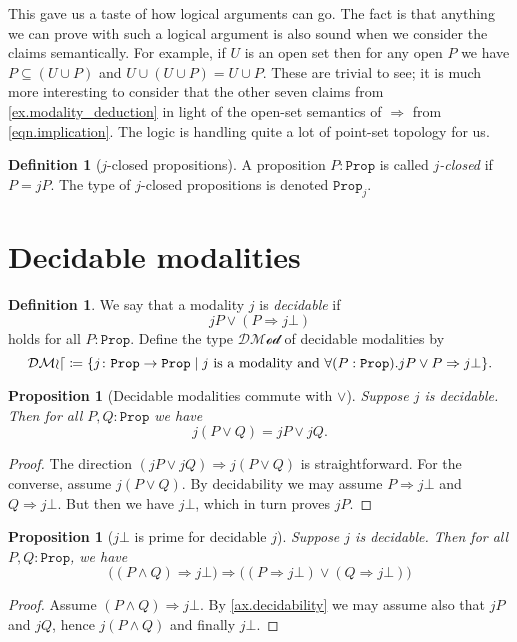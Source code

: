 \documentclass[11pt, oneside, article]{memoir}
\theoremstyle{plain}
\newtheorem{proposition}[theorem]{Proposition}
\theoremstyle{definition}
\newtheorem{definition}[theorem]{Definition}
\theoremstyle{remark}
\renewcommand{\ss}{\subseteq}
\newcommand{\const}[1]{\mathtt{#1}}
\newcommand{\tn}[1]{\textnormal{#1}}
\newcommand{\prop}{\const{Prop}}
\newcommand{\decmod}{\mathcal{DMod}}
\newcommand{\imp}{\Rightarrow}
\newcommand{\false}{\bot}
\begin{document}
This gave us a taste of how logical arguments can go. The fact is that anything we can prove with such a logical argument is also sound when we consider the claims semantically. For example, if $U$ is an open set then for any open $P$ we have $P\ss (U\cup P)$ and $U\cup(U\cup P)=U\cup P$. These are trivial to see; it is much more interesting to consider that the other seven claims from \cref{ex.modality_deduction} in light of the open-set semantics of $\imp$ from \eqref{eqn.implication}. The logic is handling quite a lot of point-set topology for us.



\begin{definition}[$j$-closed propositions]\label{def.j_closed_props}
A proposition $P:\prop$ is called \emph{$j$-closed} if $P=jP$. The type of $j$-closed propositions is denoted $\prop_j$.
\end{definition}

\section{Decidable modalities}

\begin{definition}\label{def.decidable_modality}
We say that a modality $j$ is \emph{decidable} if 
\[jP\vee (P\imp j\false)\]
holds for all $P:\prop$. Define the type $\decmod$ of decidable modalities by
\[
\decmod\coloneqq\{j\colon\prop\to\prop\mid j\tn{ is a modality and } \forall(P:\prop).jP\vee P\imp j\bot\}.
\]
\end{definition}

\begin{proposition}[Decidable modalities commute with $\vee$]
Suppose $j$ is decidable. Then for all $P,Q:\prop$ we have
\[j (P \lor Q) = j P \lor j Q.\]
\end{proposition}
\begin{proof}
The direction $(j P \lor j Q)\imp j (P \lor Q)$ is straightforward. For the converse, assume $j (P \lor Q)$. By decidability we may assume $P\imp j \bot$ and $Q\imp j \bot$. But then we have $j \bot$, which in turn proves $j P$.
\end{proof}

\begin{proposition}[$j \bot$ is prime for decidable $j$]
Suppose $j$ is decidable. Then for all $P,Q:\prop$, we have
\[\big((P\wedge Q)\imp j \false\big)\imp\big((P\imp j \false)\vee(Q\imp j \false)\big)\]
\end{proposition}
\begin{proof}
Assume $(P\wedge Q)\imp j \false$. By \cref{ax.decidability} we may assume also that $j P$ and $j Q$, hence $j (P\wedge Q)$ and finally $j \bot$.
\end{proof}
\end{document}
